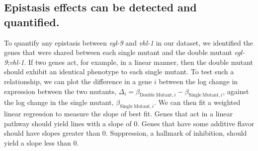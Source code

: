 \documentclass[9pt,twocolumn,twoside]{pnas-new}
\newcommand{\egl}{\emph{egl-9}}
\newcommand{\rhy}{\emph{rhy-1}}
\newcommand{\vhl}{\emph{vhl-1}}
\newcommand{\hif}{\emph{hif-1}}
\newcommand{\hifp}{HIF-1}
\begin{document}



\subsection{Epistasis effects can be detected and quantified.}
\label{sub:Epistasis}
To quantify any epistasis between \egl{} and \vhl{} in our dataset, we
identified the genes that were shared between each single mutant and the double
mutant \egl{};\vhl{}. If two genes act, for example, in a linear manner, then
the double mutant should exhibit an identical phenotype to each single mutant.
To test such a relationship, we can plot the difference in a gene $i$ between
the log change in expression between the two mutants,
$\Delta_i = \beta_{\mathrm{Double~Mutant}, i} -
\beta_{\mathrm{Single~Mutant}, i}$, against the log change in the single mutant,
$\beta_{\mathrm{Single~Mutant}, i}$. We can then fit a weighted linear regression
to measure the slope of best fit. Genes that act in a linear pathway should yield
lines with a slope of 0. Genes that have some additive flavor should have slopes
greater than 0. Suppression, a hallmark of inhibition, should yield a slope less
than 0.
\end{document}
